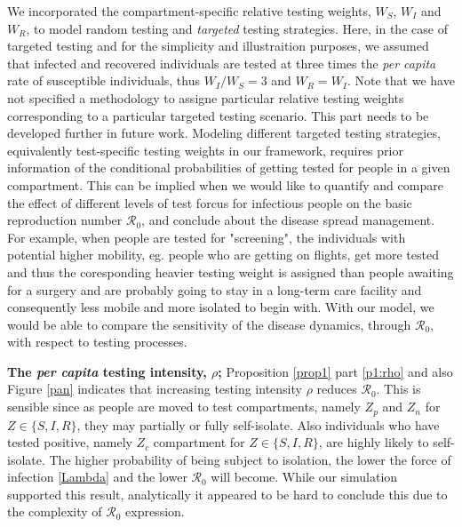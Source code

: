 \documentclass[12pt]{article}
\newcommand{\percap}{\emph{per capita}\xspace}
\newcommand{\Rnum}{\mathcal{R}_0}
\theoremstyle{definition} %
\begin{document}
We incorporated the compartment-specific relative testing weights, $W_S$, $W_I$ and $W_R$, to model random testing and \emph{targeted} testing strategies. Here, in the case of targeted testing and for the simplicity and illustraition purposes, we assumed that infected and recovered individuals are tested at three times the \percap rate of susceptible individuals, thus $W_I/W_S=3$ and $W_R=W_I$. Note that we have not specified a methodology to assigne particular relative testing weights corresponding to a particular targeted testing scenario. 
This part needs to be developed further in future work. 
Modeling different targeted testing strategies, equivalently test-specific testing weights in our framework, requires prior information of the conditional probabilities of getting tested for people in a given compartment. 
This can be implied when we would like to quantify and compare the effect of different levels of test forcus for infectious people on the basic reproduction number $\Rnum$, and conclude about the disease spread management. For example, when people are tested for "screening", the individuals with potential higher mobility, eg. people who are getting on flights, get more tested and thus the coresponding heavier testing weight is assigned than people awaiting for a surgery and are probably going to stay in a long-term care facility and consequently less mobile and more isolated to begin with. With our model, we would be able to compare the sensitivity of the disease dynamics, through $\Rnum$, with respect to testing processes.

{\bf The \percap testing intensity, $\rho$;}
Proposition \ref{prop1} part \ref{p1:rho} and also Figure \ref{pan} indicates that increasing testing intensity $\rho$ reduces $\Rnum$. This is sensible since as people are moved to test compartments, namely $Z_p$ and $Z_n$ for $Z \in \{S,I,R\}$, they may partially or fully self-isolate. Also individuals who have tested positive, namely $Z_c$ compartment for $Z \in \{S,I,R\}$, are highly likely to self-isolate. The higher probability of being subject to isolation, the lower the force of infection \eqref{Lambda} and the lower $\Rnum$ will become. While our simulation supported this result, analytically it appeared to be hard to conclude this due to the complexity of $\Rnum$ expression.  
\end{document}
